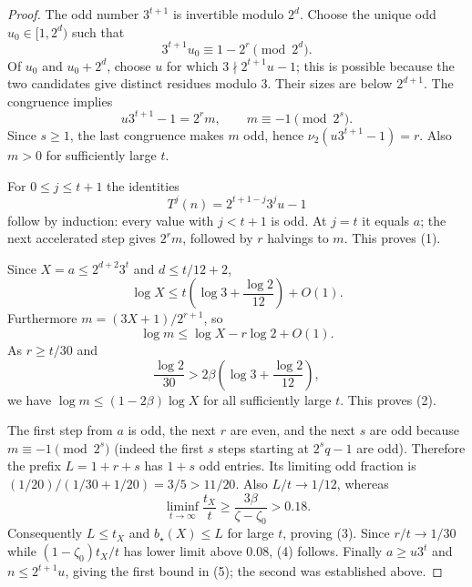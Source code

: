 \documentclass[11pt,a4paper]{article}
\newcommand{\nuTwo}{\nu_2}
\begin{document}
\begin{proof}
The odd number $3^{t+1}$ is invertible modulo $2^d$.  Choose the unique odd $u_0\in[1,2^d)$ such that
\[
 3^{t+1}u_0\equiv 1-2^r\pmod{2^d}.
\]
Of $u_0$ and $u_0+2^d$, choose $u$ for which $3\nmid 2^{t+1}u-1$; this is possible because the two candidates give distinct residues modulo $3$.  Their sizes are below $2^{d+1}$.  The congruence implies
\[
 u3^{t+1}-1=2^r m,\qquad m\equiv-1\pmod{2^s}.
\]
Since $s\ge1$, the last congruence makes $m$ odd, hence $\nuTwo(u3^{t+1}-1)=r$.  Also $m>0$ for sufficiently large $t$.

For $0\le j\le t+1$ the identities
\[
 T^j(n)=2^{t+1-j}3^j u-1
\]
follow by induction: every value with $j<t+1$ is odd.  At $j=t$ it equals $a$; the next accelerated step gives $2^rm$, followed by $r$ halvings to $m$.  This proves (1).

Since $X=a\le2^{d+2}3^t$ and $d\le t/12+2$,
\[
 \log X\le t\left(\log3+\frac{\log2}{12}\right)+O(1).
\]
Furthermore $m=(3X+1)/2^{r+1}$, so
\[
 \log m\le\log X-r\log2+O(1).
\]
As $r\ge t/30$ and
\[
 \frac{\log2}{30}> 2\beta\left(\log3+\frac{\log2}{12}\right),
\]
we have $\log m\le(1-2\beta)\log X$ for all sufficiently large $t$.  This proves (2).

The first step from $a$ is odd, the next $r$ are even, and the next $s$ are odd because $m\equiv-1\pmod{2^s}$ (indeed the first $s$ steps starting at $2^sq-1$ are odd).  Therefore the prefix $L=1+r+s$ has $1+s$ odd entries.  Its limiting odd fraction is $(1/20)/(1/30+1/20)=3/5>11/20$.  Also $L/t\to1/12$, whereas
\[
 \liminf_{t\to\infty}\frac{t_X}{t}\ge\frac{3\beta}{\zeta-\zeta_0}>0.18.
\]
Consequently $L\le t_X$ and $b_\star(X)\le L$ for large $t$, proving (3).  Since $r/t\to1/30$ while $(1-\zeta_0)t_X/t$ has lower limit above $0.08$, (4) follows.  Finally $a\ge u3^t$ and $n\le2^{t+1}u$, giving the first bound in (5); the second was established above.
\end{proof}
\end{document}
